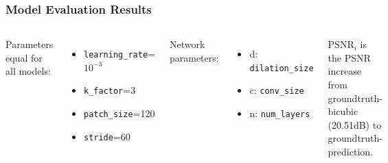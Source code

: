 \documentclass{beamer}
\begin{document}
\begin{frame}
    \frametitle{Model Evaluation Results}
    \begin{columns}[t]
        \small
        Parameters equal for all models:
        \begin{itemize}
            \item \texttt{learning\_rate}=$10^{-3}$
            \item \texttt{k\_factor}=3
            \item \texttt{patch\_size}=120
            \item \texttt{stride}=60
        \end{itemize}

        Network parameters:
        \begin{itemize}
            \item d: \texttt{dilation\_size}
            \item c: \texttt{conv\_size}
            \item n: \texttt{num\_layers}
        \end{itemize}
        
        \vspace{10pt}
        \footnotesize
        $\text{PSNR}_i$ is the PSNR increase from groundtruth-bicubic (20.51dB) to groundtruth-prediction.


\end{columns}
\end{frame}
\end{document}
